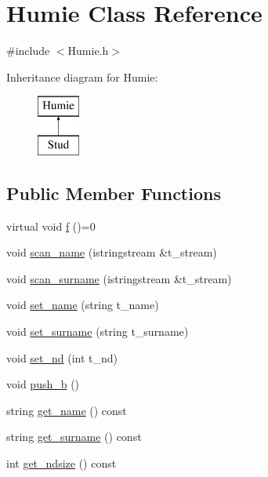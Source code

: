 \hypertarget{class_humie}{}\section{Humie Class Reference}
\label{class_humie}


{\ttfamily \#include $<$Humie.\+h$>$}

Inheritance diagram for Humie\+:\begin{figure}[H]
\begin{center}
\leavevmode
\includegraphics[height=2.000000cm]{class_humie}
\end{center}
\end{figure}
\subsection*{Public Member Functions}
\begin{DoxyCompactItemize}
\item 
virtual void \mbox{\hyperlink{class_humie_a1bfe9cf46655ca5952b83c1652d8c0a1}{f}} ()=0
\item 
void \mbox{\hyperlink{class_humie_a5552bf054c13cafd3e921b7de259b2d9}{scan\+\_\+name}} (istringstream \&t\+\_\+stream)
\item 
void \mbox{\hyperlink{class_humie_a98ca5452603ec476e06c6e73fd4007bb}{scan\+\_\+surname}} (istringstream \&t\+\_\+stream)
\item 
void \mbox{\hyperlink{class_humie_ad017a3f3950555056f3e9e9c904399c8}{set\+\_\+name}} (string t\+\_\+name)
\item 
void \mbox{\hyperlink{class_humie_ac42c5deca59ef1519b43fa4cb203f551}{set\+\_\+surname}} (string t\+\_\+surname)
\item 
void \mbox{\hyperlink{class_humie_aa73ce86c3603663083ae0d5c8b532157}{set\+\_\+nd}} (int t\+\_\+nd)
\item 
void \mbox{\hyperlink{class_humie_aa6368dac76b40953826412687225f90b}{push\+\_\+b}} ()
\item 
string \mbox{\hyperlink{class_humie_ac2878f4f3c6d4c9450e286401d96d50c}{get\+\_\+name}} () const
\item 
string \mbox{\hyperlink{class_humie_a984520f9906583e9daf46c4d6ea21712}{get\+\_\+surname}} () const
\item 
int \mbox{\hyperlink{class_humie_a403431ff800cd4855abd484061a2aa85}{get\+\_\+ndsize}} () const
\end{DoxyCompactItemize}
